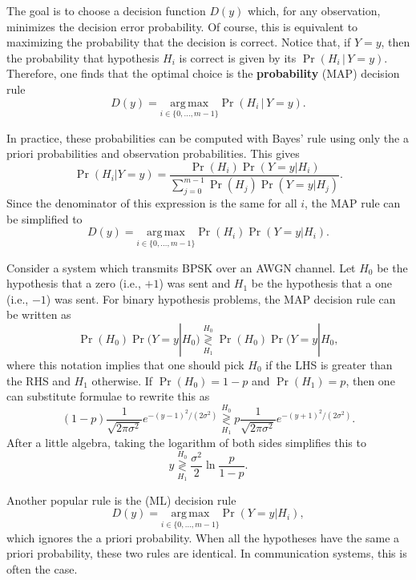 The goal is to choose a decision function $D(y)$ which, for any observation, minimizes the decision error probability.
Of course, this is equivalent to maximizing the probability that the decision is correct.
Notice that, if $Y=y$, then the probability that hypothesis $H_i$ is correct is given by its  $\Pr (H_i \, | \, Y=y )$.
Therefore, one finds that the optimal choice is the  \textbf{probability} (MAP) decision rule 
\[ D(y) = \underset{i\in\{0,\ldots,m-1\}}{\mathrm{arg\,max}} \Pr( H_i \, |  \, Y=y). \]

In practice, these probabilities can be computed with Bayes' rule using only the a priori probabilities and observation probabilities.
This gives
\[ \Pr \left(H_i | Y=y \right) =
\frac{\Pr(H_i) \Pr (Y=y | H_i) }{\sum_{j=0}^{m-1} \Pr(H_j) \Pr (Y=y | H_j)}. \]
Since the denominator of this expression is the same for all $i$, the MAP rule can be simplified to
\[ D(y) = \underset{i\in\{0,\ldots,m-1\}}{\mathrm{arg\,max}} \Pr(H_i) \Pr (Y=y | H_i). \]

\begin{example}
Consider a system which transmits BPSK over an AWGN channel.
Let $H_0$ be the hypothesis that a zero (i.e., $+1$) was sent and $H_1$ be the hypothesis that a one (i.e., $-1$) was sent.
For binary hypothesis problems, the MAP decision rule can be written as
\[ \Pr (H_0) \Pr (Y=y | H_0) \underset{H_1}{\overset{H_0}{\gtrless}}  \Pr (H_0) \Pr (Y=y | H_0, \]
where this notation implies that one should pick $H_0$ if the LHS is greater than the RHS and $H_1$ otherwise.
If $\Pr(H_0) = 1-p$ and $\Pr (H_1) = p$, then one can substitute formulae to rewrite this as
\[ (1-p)  \frac{1}{\sqrt{2\pi \sigma^2}} e^{-(y-1)^2 / (2\sigma^2)} \underset{H_1}{\overset{H_0}{\gtrless}}  p \frac{1}{\sqrt{2\pi \sigma^2}} e^{-(y+1)^2 / (2\sigma^2)}.\]
After a little algebra, taking the logarithm of both sides simplifies this to 
\[ y \underset{H_1}{\overset{H_0}{\gtrless}} \frac{\sigma^2}{2}  \ln \frac{p}{1-p}.\]
\end{example}

Another popular rule is the  (ML) decision rule
\[ D(y) = \underset{i\in\{0,\ldots,m-1\}}{\mathrm{arg\,max}} \Pr (Y=y | H_i), \]
which ignores the a priori probability.
When all the hypotheses have the same a priori probability, these two rules are identical.
In communication systems, this is often the case.


